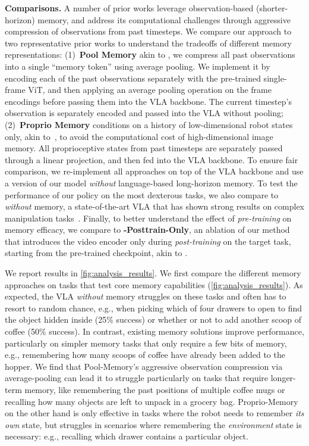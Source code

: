 \textbf{Comparisons.} A number of prior works leverage observation-based (shorter-horizon) memory, and address its computational challenges through aggressive compression of observations from past timesteps. We compare our approach to two representative prior works to understand the tradeoffs of different memory representations: (1)~\textbf{Pool Memory} akin to \citet{jang2025contextvla}, we
compress all past observations into a single ``memory token'' using average pooling. We implement it by encoding each of the past observations separately with the pre-trained single-frame ViT, and then applying an average pooling operation on the frame encodings before passing them into the VLA backbone. The current timestep's observation is separately encoded and passed into the VLA without pooling; (2)~\textbf{Proprio Memory} conditions on a history of low-dimensional robot states only, akin to~\citep{zhang2025ta}, to avoid the computational cost of high-dimensional image memory. All proprioceptive states from past timesteps are separately passed through a linear projection, and then fed into the VLA backbone. To ensure fair comparison, we re-implement all approaches on top of the \pizerosix{} VLA backbone and use a version of our model \emph{without} language-based long-horizon memory. To test the performance of our policy on the most dexterous tasks, we also compare to \textbf{\pizerosix{}} \emph{without} memory, a state-of-the-art VLA that has shown strong results on complex manipulation tasks~\citep{pi06_model_card}. Finally, to better understand the effect of \emph{pre-training} on memory efficacy, we compare to \textbf{\Acronym{}-Posttrain-Only}, an ablation of our method that introduces the video encoder only during \emph{post-training} on the target task, starting from the pre-trained \pizerosix{} checkpoint, akin to \citet{li2025cronusvla}.



We report results in \cref{fig:analysis_results}. We first compare the different memory approaches on tasks that test core memory capabilities (\cref{fig:analysis_results}). As expected, the \pizerosix{} VLA \emph{without} memory struggles on these tasks and often has to resort to random chance, e.g., when picking which of four drawers to open to find the object hidden inside (25\% success) or whether or not to add another scoop of coffee (50\% success). In contrast, existing memory solutions improve performance, particularly on simpler memory tasks that only require a few bits of memory, e.g., remembering how many scoops of coffee have already been added to the hopper. We find that Pool-Memory's aggressive observation compression via average-pooling can lead it to struggle particularly on tasks that require longer-term memory, like remembering the past positions of multiple coffee mugs or recalling how many objects are left to unpack in a grocery bag. Proprio-Memory on the other hand is only effective in tasks where the robot needs to remember \emph{its own} state, but struggles in scenarios where remembering the \emph{environment} state is necessary: e.g., recalling which drawer contains a particular object.

